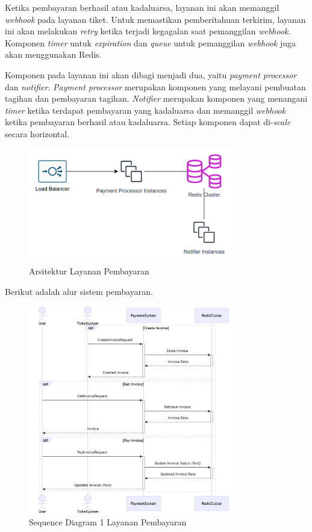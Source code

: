 Ketika pembayaran berhasil atau kadaluarsa, layanan ini akan memanggil \textit{webhook} pada layanan tiket. Untuk memastikan pemberitahuan terkirim, layanan ini akan melakukan \textit{retry} ketika terjadi kegagalan saat pemanggilan \textit{webhook}. Komponen \textit{timer} untuk \textit{expiration} dan \textit{queue} untuk pemanggilan \textit{webhook} juga akan menggunakan Redis.

Komponen pada layanan ini akan dibagi menjadi dua, yaitu \textit{payment processor} dan \textit{notifier}. \textit{Payment processor} merupakan komponen yang melayani pembuatan tagihan dan pembayaran tagihan. \textit{Notifier} merupakan komponen yang menangani \textit{timer} ketika terdapat pembayaran yang kadaluarsa dan  memanggil \textit{webhook} ketika pembayaran berhasil atau kadaluarsa. Setiap komponen dapat di-\textit{scale} secara horizontal.

\begin{figure}[htbp]
    \centering
    \includegraphics[width=0.8\textwidth]{resources/chapter-3/payment-service.png}
    \caption{Arsitektur Layanan Pembayaran}
    \label{fig:payment-service-deployment}
\end{figure}

Berikut adalah alur sistem pembayaran.

\begin{figure}[htbp]
    \centering
    \includegraphics[width=0.8\textwidth]{resources/chapter-3/payment-flow1.png}
    \caption{Sequence Diagram 1 Layanan Pembayaran}
    \label{fig:payment-flow1}
\end{figure}

